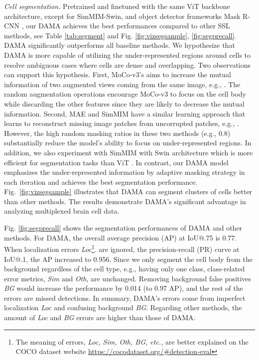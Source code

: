 \documentclass[10pt,twocolumn,letterpaper]{article}
\begin{document}
\textcolor{nblue}{\textit{Cell segmentation.}} Pretrained and finetuned with the same ViT backbone architecture, except for SimMIM-Swin, and object detector frameworks Mask R-CNN \cite{maskrcnn}, our DAMA achieves the best performances compared to other SSL methods, see Table \ref{tab:segment} and Fig. \ref{fig:vizsegsample}, \ref{fig:segprecall}. DAMA significantly outperforms all baseline methods. We hypothesize that DAMA is more capable of utilizing the under-represented regions around cells to resolve ambiguous cases where cells are dense and overlapping. Two observations can support this hypothesis. First, MoCo-v3's \cite{mocov3} aims to increase the mutual information of two augmented views coming from the same image, e.g., . The random augmentation operations encourage MoCo-v3 to focus on the cell body while discarding the other features since they are likely to decrease the mutual information. Second, MAE \cite{mae} and SimMIM \cite{simmim} have a similar learning approach that learns to reconstruct missing image patches from uncorrupted patches, e.g., . However, the high random masking ratios in these two methods (e.g., 0.8) substantially reduce the model's ability to focus on under-represented regions.  
In addition, we also experiment with SimMIM with Swin \cite{swin} architecture which is more efficient for segmentation tasks than ViT \cite{simmim,swin}. In contrast, our DAMA model emphasizes the under-represented information by adaptive masking strategy in each iteration and achieves the best segmentation performance. Fig.~\ref{fig:vizsegsample} illustrates that DAMA can segment clusters of cells better than other methods. The results demonstrate DAMA's significant advantage in analyzing multiplexed brain cell data.

Fig. \ref{fig:segprecall} shows the segmentation performances of DAMA and other methods. For DAMA, the overall average precision (AP) at IoU@.75 is 0.77. When localization errors \textit{Loc}\footnote{The meaning of errors, \textit{Loc, Sim, Oth, BG, etc.,} are better explained on the COCO dataset website \url{https://cocodataset.org/\#detection-eval}}. are ignored, the precision-recall (PR) curve at IoU@.1, the AP increased to 0.956. Since we only segment the cell body from the background regardless of the cell type, e.g., having only one class, class-related error metrics, \textit{Sim} and \textit{Oth}, are unchanged. Removing background false positives \textit{BG} would increase the performance by 0.014 (to 0.97 AP), and the rest of the errors are missed detections. In summary, DAMA's errors come from imperfect localization \textit{Loc} and confusing background \textit{BG}. Regarding other methods, the amount of \textit{Loc} and \textit{BG} errors are higher than those of DAMA.
\end{document}
